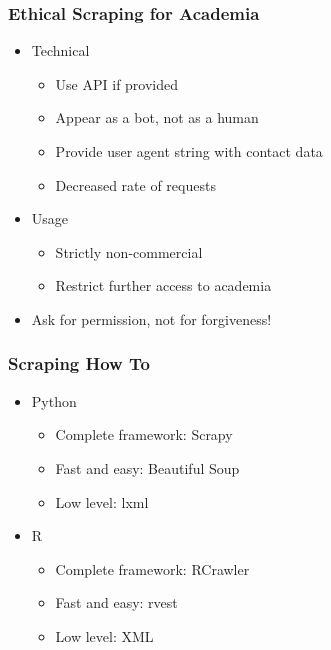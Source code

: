 \begin{frame}
    \frametitle{Ethical Scraping for Academia}
\begin{itemize}
    \item Technical
    \begin{itemize}
    \item Use API if provided
    \item Appear as a bot, not as a human
    \item Provide user agent string with contact data
    \item Decreased rate of requests
    \end{itemize}
    \end{itemize}
    \vspace{5pt}
    \begin{itemize}
    \item Usage
    \begin{itemize}
    \item Strictly non-commercial
    \item Restrict further access to academia
    \end{itemize}
\end{itemize}
    \vspace{5pt}
    \begin{itemize}
    \item Ask for permission, not for forgiveness!
    \end{itemize}
\end{frame}


\begin{frame}
    \frametitle{Scraping How To}
\begin{itemize}
    \item Python
    \begin{itemize}
        \item Complete framework: Scrapy
        \item Fast and easy: Beautiful Soup
        \item Low level: lxml
    \end{itemize}
\end{itemize}

\begin{itemize}
    \item R
    \begin{itemize}
        \item Complete framework: RCrawler
        \item Fast and easy: rvest
        \item Low level: XML
    \end{itemize}
\end{itemize}
\end{frame}

